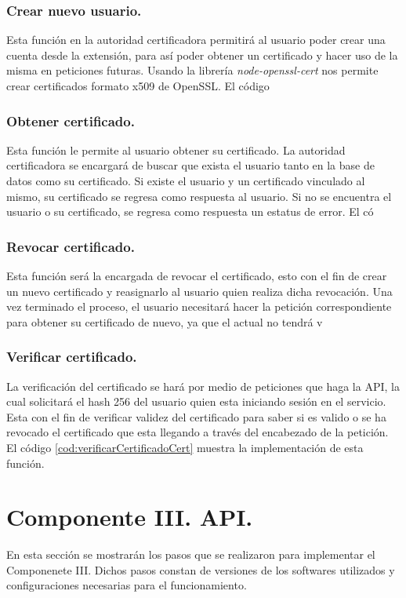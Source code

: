 \documentclass[12pt, a4paper, titlepage]{report}
\begin{document}
            \subsubsection{Crear nuevo usuario.}
            Esta función en la autoridad certificadora permitirá al usuario poder crear una cuenta desde la extensión, para así poder obtener un certificado y hacer uso de la misma en peticiones futuras. Usando la librería \textit{node-openssl-cert} nos permite crear certificados formato x509 de OpenSSL. El código 
       
            \subsubsection{Obtener certificado.}
            Esta función le permite al usuario obtener su certificado. La autoridad certificadora se encargará de buscar que exista el usuario tanto en la base de datos como su certificado. Si existe el usuario y un certificado vinculado al mismo, su certificado se regresa como respuesta al usuario. Si no se encuentra el usuario o su certificado, se regresa como respuesta un estatus de error. El có
	         
	        \subsubsection{Revocar certificado.}
            Esta función será la encargada de revocar el certificado, esto con el fin de crear un nuevo certificado y reasignarlo al usuario quien realiza dicha revocación. Una vez terminado el proceso, el usuario necesitará hacer la petición correspondiente para obtener su certificado de nuevo, ya que el actual no tendrá v
       
            \subsubsection{Verificar certificado.}
            La verificación del certificado se hará por medio de peticiones que haga la API, la cual solicitará el hash 256 del usuario quien esta iniciando sesión en el servicio. Esta con el fin de verificar validez del certificado para saber si es valido o se ha revocado el certificado que esta llegando a través del encabezado de la petición. El código \ref{cod:verificarCertificadoCert} muestra la implementación de esta función.
            
       
       
        \section{Componente III. API.}
	        En esta sección se mostrarán los pasos que se realizaron para implementar el Componenete III. Dichos pasos constan de versiones de los softwares utilizados y configuraciones necesarias para el funcionamiento.
	        
\end{document}
